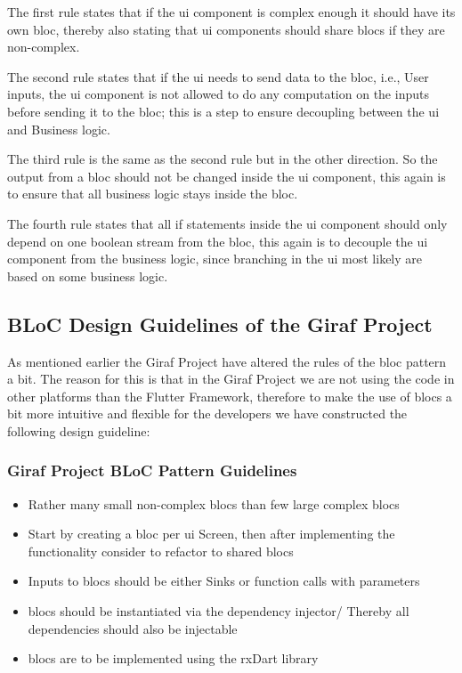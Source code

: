 The first rule states that if the \gls{ui} component is complex enough it should have its own \gls{bloc}, thereby also stating that \gls{ui} components should share \glspl{bloc} if they are non-complex.

The second rule states that if the \gls{ui} needs to send data to the \gls{bloc}, i.e., User inputs, the \gls{ui} component is not allowed to do any computation on the inputs before sending it to the \gls{bloc}; this is a step to ensure decoupling between the \gls{ui} and Business logic.

The third rule is the same as the second rule but in the other direction. So the output from a \gls{bloc} should not be changed inside the \gls{ui} component, this again is to ensure that all business logic stays inside the \gls{bloc}.

The fourth rule states that all if statements inside the \gls{ui} component should only depend on one boolean stream from the \gls{bloc}, this again is to decouple the \gls{ui} component from the business logic, since branching in the \gls{ui} most likely are based on some business logic.

\subsection{BLoC Design Guidelines of the Giraf Project}
As mentioned earlier the Giraf Project have altered the rules of the \gls{bloc} pattern a bit. The reason for this is that in the Giraf Project we are not using the code in other platforms than the Flutter Framework, therefore to make the use of \glspl{bloc} a bit more intuitive and flexible for the developers we have constructed the following design guideline:

\subsubsection{Giraf Project BLoC Pattern Guidelines}
\begin{itemize}
  \item Rather many small non-complex \glspl{bloc} than few large complex \glspl{bloc}
  \item Start by creating a \gls{bloc} per \gls{ui} Screen, then after implementing the functionality consider to refactor to shared \glspl{bloc}
  \item Inputs to \glspl{bloc} should be either Sinks or function calls with parameters
  \item \glspl{bloc} should be instantiated via the dependency injector/ Thereby all dependencies should also be injectable
  \item \glspl{bloc} are to be implemented using the rxDart library
\end{itemize}


